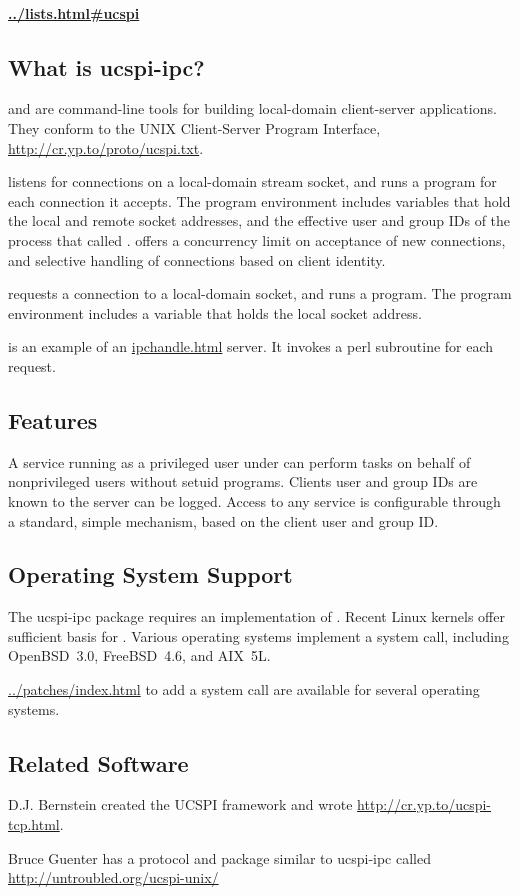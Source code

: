 \documentclass{book}
\begin{document}
\paragraph{\href{A mailing list for ucspi-ipc and general ucspi discussion}{../lists.html\#ucspi}}


\subsection{What is ucspi-ipc?}
 and  are command-line tools for
building local-domain client-server applications.  They conform to the
UNIX Client-Server Program Interface,
\href{UCSPI}{http://cr.yp.to/proto/ucspi.txt}.

 listens for connections on a local-domain
stream socket, and runs a program for each connection it accepts.  The
program environment includes variables that hold the local and remote
socket addresses, and the effective user and group IDs of the process
that called .   offers a concurrency limit
on acceptance of new connections, and selective handling of
connections based on client identity.

 requests a connection to a local-domain socket,
and runs a program.  The program environment includes a variable that
holds the local socket address.

 is an example of an \href{\cmd{ipchandle}}{ipchandle.html}
server.  It invokes a perl subroutine for each request.

\subsection{Features}
A service running as a privileged user under  can perform tasks
on behalf of nonprivileged users without setuid programs.  Clients user and
group IDs are known to the server can be logged.  Access to any service is
configurable through a standard, simple mechanism, based on the client user and
group ID.

\subsection{Operating System Support}
The ucspi-ipc package requires an implementation of .
Recent Linux kernels offer sufficient basis for .
Various operating systems implement a  system call,
including OpenBSD~3.0, FreeBSD~4.6, and AIX~5L.

\href{Patches}{../patches/index.html} to add a  system
call are available for several operating systems.


\subsection{Related Software}
D.J. Bernstein created the UCSPI framework and wrote
\href{ucspi-tcp}{http://cr.yp.to/ucspi-tcp.html}.

Bruce Guenter has a protocol and package similar to ucspi-ipc called
\href{ucspi-unix}{http://untroubled.org/ucspi-unix/}
\end{document}
